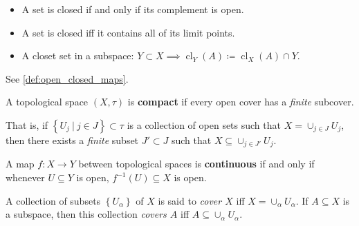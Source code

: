 \begin{definition}

\envlist

\begin{itemize}
\tightlist
\item
  A set is closed if and only if its complement is open.
\item
  A set is closed iff it contains all of its limit points.
\item
  A closet set in a subspace:
  \(Y\subset X \implies \operatorname{cl}_{Y}(A) \coloneqq\operatorname{cl}_{X}(A)\cap Y\).
\end{itemize}

\end{definition}

\begin{definition}

See \cref{def:open_closed_maps}.

\end{definition}

\begin{definition}[Compact]

A topological space \((X, \tau)\) is \textbf{compact} if every open
cover has a \emph{finite} subcover.

That is, if
\(\left\{{U_{j} {~\mathrel{\Big|}~}j\in J}\right\} \subset \tau\) is a
collection of open sets such that \(X = \cup_{j\in J} U_{j}\), then
there exists a \emph{finite} subset \(J' \subset J\) such that
\(X \subseteq \cup_{j\in J'} U_{j}\).

\end{definition}

\begin{definition}

A map \(f:X\to Y\) between topological spaces is \textbf{continuous} if
and only if whenever \(U \subseteq Y\) is open,
\(f ^{-1} (U) \subseteq X\) is open.

\end{definition}

\begin{definition}[Cover]

A collection of subsets \(\left\{{U_\alpha}\right\}\) of \(X\) is said
to \emph{cover \(X\)} iff \(X = \cup_{\alpha} U_\alpha\). If
\(A\subseteq X\) is a subspace, then this collection \emph{covers \(A\)}
iff \(A\subseteq \cup_{\alpha} U_\alpha\).

\end{definition}

